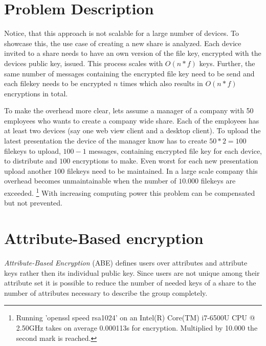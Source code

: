 \section{Problem Description}

Notice, that this approach is not scalable for a large number of devices. To showcase this, the use case of creating a new share is analyzed. Each device invited to a share needs to have an own version of the file key, encrypted with the devices public key, issued. This process scales with $O(n * f)$ keys. 
Further, the same number of messages containing the encrypted file key need to be send and each filekey needs to be encrypted $n$ times which also results in $O(n * f)$ encryptions in total. 

To make the overhead more clear, lets assume a manager of a company with 50 employees who wants to create a company wide share. Each of the employees has at least two devices (say one web view client and a desktop client). To upload the latest presentation the device of the manager know has to create $50 * 2 = 100$ filekeys to upload, $100-1$ messages, containing encrypted file key for each device, to distribute and $100$ encryptions to make. Even worst for each new presentation upload another $100$ filekeys need to be maintained. In a large scale company this overhead becomes unmaintainable when the number of $10.000$ filekeys are exceeded. \footnote{Running 'openssl speed rsa1024' on an Intel(R) Core(TM) i7-6500U CPU @ 2.50GHz takes on average 0.000113s for encryption. Multiplied by 10.000 the second mark is reached.} With increasing computing power this problem can be compensated but not prevented.

\section{Attribute-Based encryption}
\label{sec:attribute-based-encryption}
\textit{Attribute-Based Encryption} (\ac{ABE}) defines users over attributes and attribute keys rather then its individual public key. Since users are not unique among their attribute set it is possible to reduce the number of needed keys of a share to the number of attributes necessary to describe the group completely. 

